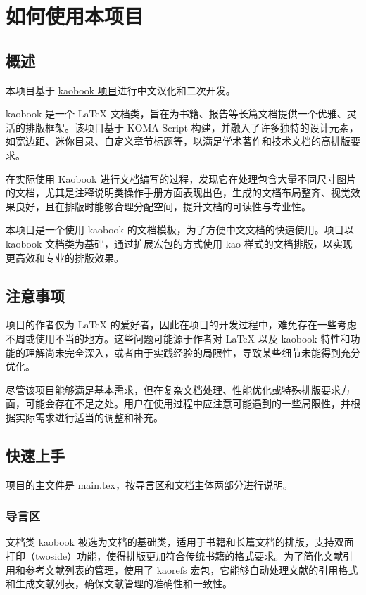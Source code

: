 \setchapterpreamble[u]{\margintoc}
\chapter{如何使用本项目}

\section{概述}
本项目基于 \href{https://github.com/fmarotta/kaobook}{kaobook 项目}进行中文汉化和二次开发。

kaobook 是一个 LaTeX 文档类，旨在为书籍、报告等长篇文档提供一个优雅、灵活的排版框架。该项目基于 KOMA-Script 构建，并融入了许多独特的设计元素，如宽边距、迷你目录、自定义章节标题等，以满足学术著作和技术文档的高排版要求。

在实际使用 Kaobook 进行文档编写的过程，发现它在处理包含大量不同尺寸图片的文档，尤其是注释说明类操作手册方面表现出色，生成的文档布局整齐、视觉效果良好，且在排版时能够合理分配空间，提升文档的可读性与专业性。

本项目是一个使用 kaobook 的文档模板，为了方便中文文档的快速使用。项目以 kaobook 文档类为基础，通过扩展宏包的方式使用 kao 样式的文档排版，以实现更高效和专业的排版效果。

\section{注意事项}

项目的作者仅为 LaTeX 的爱好者，因此在项目的开发过程中，难免存在一些考虑不周或使用不当的地方。这些问题可能源于作者对 LaTeX 以及 kaobook 特性和功能的理解尚未完全深入，或者由于实践经验的局限性，导致某些细节未能得到充分优化。

尽管该项目能够满足基本需求，但在复杂文档处理、性能优化或特殊排版要求方面，可能会存在不足之处。用户在使用过程中应注意可能遇到的一些局限性，并根据实际需求进行适当的调整和补充。

\section{快速上手}

项目的主文件是 main.tex，按导言区和文档主体两部分进行说明。

\subsection{导言区}

文档类 kaobook 被选为文档的基础类，适用于书籍和长篇文档的排版，支持双面打印（twoside）功能，使得排版更加符合传统书籍的格式要求。为了简化文献引用和参考文献列表的管理，使用了 kaorefs 宏包，它能够自动处理文献的引用格式和生成文献列表，确保文献管理的准确性和一致性。

